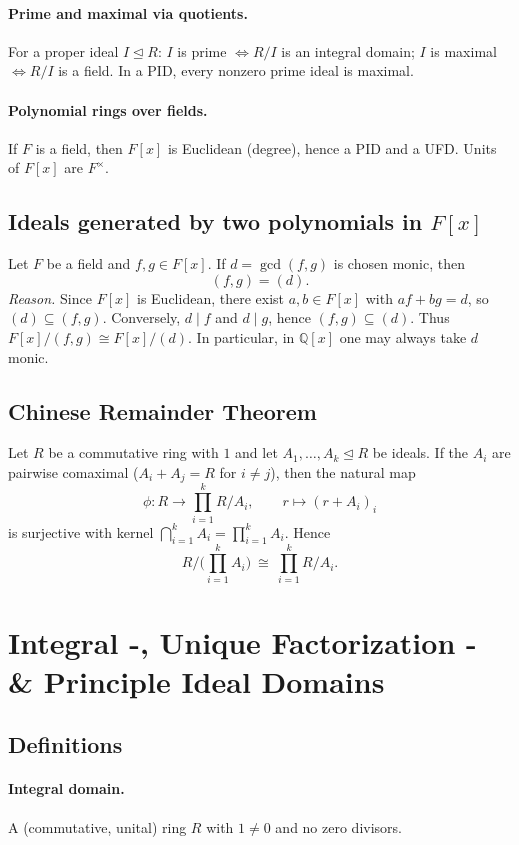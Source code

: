 \documentclass[12pt]{article}
\begin{document}
\paragraph{Prime and maximal via quotients.}
For a proper ideal $I\unlhd R$: $I$ is prime $\iff R/I$ is an integral domain; 
$I$ is maximal $\iff R/I$ is a field. In a PID, every nonzero prime ideal is maximal.

\paragraph{Polynomial rings over fields.}
If $F$ is a field, then $F[x]$ is Euclidean (degree), hence a PID and a UFD. 
Units of $F[x]$ are $F^\times$.

\subsection{Ideals generated by two polynomials in $F[x]$}
Let $F$ be a field and $f,g\in F[x]$. If $d=\gcd(f,g)$ is chosen monic, then
\[
(f,g)=(d).
\]
\emph{Reason.} Since $F[x]$ is Euclidean, there exist $a,b\in F[x]$ with $af+bg=d$, so $(d)\subseteq(f,g)$. 
Conversely, $d\mid f$ and $d\mid g$, hence $(f,g)\subseteq(d)$. Thus $F[x]/(f,g)\cong F[x]/(d)$. 
In particular, in $\mathbb{Q}[x]$ one may always take $d$ monic. 

\subsection{Chinese Remainder Theorem}
Let $R$ be a commutative ring with $1$ and let $A_1,\dots,A_k\unlhd R$ be ideals.
If the $A_i$ are pairwise comaximal ($A_i+A_j=R$ for $i\neq j$), then the natural map
\[
\phi:R \longrightarrow \prod_{i=1}^k R/A_i,\qquad r\mapsto (r+A_i)_i
\]
is surjective with kernel $\bigcap_{i=1}^k A_i=\prod_{i=1}^k A_i$. Hence
\[
R\big/\!\big(\textstyle\prod_{i=1}^k A_i\big)\ \cong\ \prod_{i=1}^k R/A_i .
\]

\section{Integral -, Unique Factorization - \& Principle Ideal Domains}
\subsection{Definitions}
\paragraph{Integral domain.}
A (commutative, unital) ring $R$ with $1\neq 0$ and no zero divisors.
\end{document}
